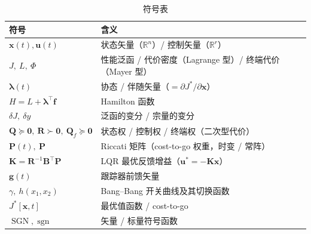\begin{table}[H]\centering\small
\caption{符号表}
\begin{tabular}{ll}
\toprule
符号 & 含义 \\
\midrule
$\mathbf{x}(t),\mathbf{u}(t)$ & 状态矢量（$\mathbb R^n$）/ 控制矢量（$\mathbb R^r$） \\
$J,\ L,\ \Phi$ & 性能泛函 / 代价密度（Lagrange 型）/ 终端代价（Mayer 型） \\
$\boldsymbol\lambda(t)$ & 协态 / 伴随矢量（$=\partial J^*/\partial\mathbf x$） \\
$H=L+\boldsymbol\lambda^\top\mathbf f$ & Hamilton 函数 \\
$\delta J,\ \delta y$ & 泛函的变分 / 宗量的变分 \\
$\mathbf Q\succeq\mathbf0,\ \mathbf R\succ\mathbf0,\ \mathbf Q_f\succeq\mathbf0$ & 状态权 / 控制权 / 终端权（二次型代价） \\
$\mathbf P(t),\ \mathbf P$ & Riccati 矩阵（cost-to-go 权重，时变 / 常阵） \\
$\mathbf K=\mathbf R^{-1}\mathbf B^\top\mathbf P$ & LQR 最优反馈增益（$\mathbf u^*=-\mathbf K\mathbf x$） \\
$\mathbf g(t)$ & 跟踪器前馈矢量 \\
$\gamma,\ h(x_1,x_2)$ & Bang--Bang 开关曲线及其切换函数 \\
$J^*[\mathbf x,t]$ & 最优值函数 / cost-to-go \\
$\operatorname{SGN},\operatorname{sgn}$ & 矢量 / 标量符号函数 \\
\bottomrule
\end{tabular}
\end{table}

